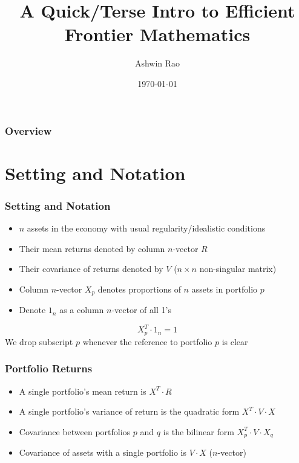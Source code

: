 \documentclass{beamer}
\title[Efficient Frontier Mathematics]{A Quick/Terse Intro to Efficient Frontier Mathematics} %
\author{Ashwin Rao} %
\institute[Stanford] %
{
ICME, Stanford University
}
\date{\today} %
\begin{document}
\begin{frame}
\titlepage %
\end{frame}

\begin{frame}
\frametitle{Overview} %
\tableofcontents %
\end{frame}

\section{Setting and Notation}

\begin{frame}
\frametitle{Setting and Notation}
\begin{itemize}
\item $n$ assets in the economy with usual regularity/idealistic conditions
\item Their mean returns denoted by column $n$-vector $R$
\item Their covariance of returns denoted by $V$ ($n \times n$ non-singular matrix)
\item Column $n$-vector $X_p$ denotes proportions of $n$ assets in portfolio $p$
\item Denote $1_n$ as a column $n$-vector of all 1's
\end{itemize}
$$X_p^T \cdot 1_n = 1$$
We drop subscript $p$ whenever the reference to portfolio $p$ is clear
\end{frame}

\begin{frame}
\frametitle{Portfolio Returns}
\begin{itemize}
\item A single portfolio's mean return is $X^T \cdot R$
\item A single portfolio's variance of return is the quadratic form $X^T \cdot V \cdot X$
\item Covariance between portfolios $p$ and $q$ is the bilinear form $X_p^T \cdot V \cdot X_q$
\item Covariance of assets with a single portfolio is $V \cdot X$ ($n$-vector)
\end{itemize}
\end{frame}
\end{document}
